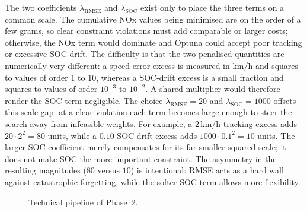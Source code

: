 The two coefficients $\lambda_{\text{RMSE}}$ and $\lambda_{\text{SOC}}$ exist only to place the three terms on a common scale. The cumulative \ac{NOx} values being minimised are on the order of a few grams, so clear constraint violations must add comparable or larger costs; otherwise, the \ac{NOx} term would dominate and Optuna could accept poor tracking or excessive \ac{SOC} drift. The difficulty is that the two penalised quantities are numerically very different: a speed-error excess is measured in km/h and squares to values of order $1$ to $10$, whereas a \ac{SOC}-drift excess is a small fraction and squares to values of order $10^{-3}$ to $10^{-2}$. A shared multiplier would therefore render the \ac{SOC} term negligible. The choice $\lambda_{\text{RMSE}} = 20$ and $\lambda_{\text{SOC}} = 1000$ offsets this scale gap: at a clear violation each term becomes large enough to steer the search away from infeasible weights. For example, a $2\,\text{km/h}$ tracking excess adds $20 \cdot 2^2 = 80$ units, while a $0.10$ \ac{SOC}-drift excess adds $1000 \cdot 0.1^2 = 10$ units. The larger \ac{SOC} coefficient merely compensates for its far smaller squared scale; it does not make \ac{SOC} the more important constraint. The asymmetry in the resulting magnitudes ($80$ versus $10$) is intentional: \ac{RMSE} acts as a hard wall against catastrophic forgetting, while the softer \ac{SOC} term allows more flexibility.

\begin{figure}[htbp]
  \centering
  
  \caption[Technical pipeline of Phase~2]{Technical pipeline of Phase~2.}
  \label{fig:phase2}
\end{figure}
